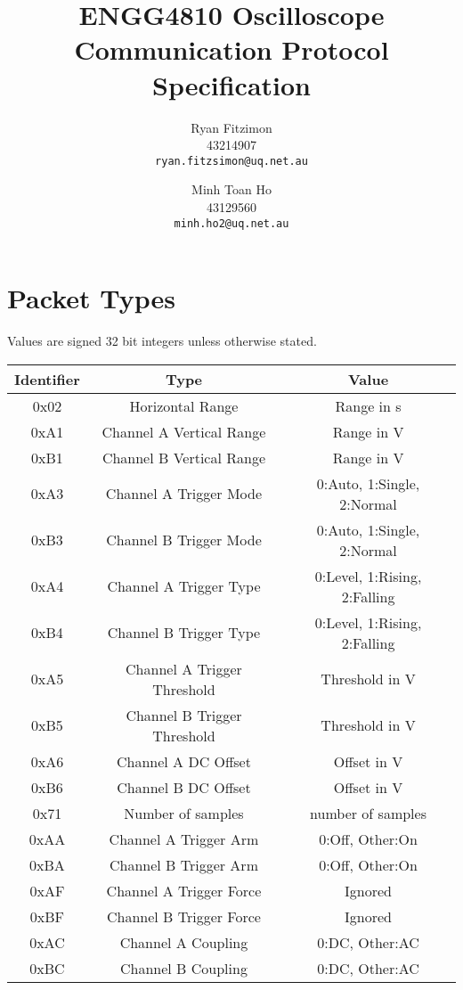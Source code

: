 \documentclass[]{article}
\title{ENGG4810 Oscilloscope Communication Protocol Specification}
\author{
	Ryan Fitzimon\\
	43214907\\
	\texttt{ryan.fitzsimon@uq.net.au}
	\and
	Minh Toan Ho\\
	43129560\\
	\texttt{minh.ho2@uq.net.au}
}
\begin{document}
\maketitle

\section{Packet Types}

Values are signed 32 bit integers unless otherwise stated.

\begin{table}[H]
	\renewcommand{\arraystretch}{1.2}
	\centering
	\begin{tabular}{|c|c|c|}
		\hline
		\textbf{Identifier} & \textbf{Type} & \textbf{Value} \\ \hline
		0x02 & Horizontal Range & Range in \textmu s \\ \hline
		0xA1 & Channel A Vertical Range & Range in \textmu V \\ \hline
		0xB1 & Channel B Vertical Range & Range in \textmu V \\ \hline
		0xA3 & Channel A Trigger Mode & 0:Auto, 1:Single, 2:Normal \\ \hline
		0xB3 & Channel B Trigger Mode & 0:Auto, 1:Single, 2:Normal \\ \hline
		0xA4 & Channel A Trigger Type & 0:Level, 1:Rising, 2:Falling \\ \hline
		0xB4 & Channel B Trigger Type & 0:Level, 1:Rising, 2:Falling \\ \hline
		0xA5 & Channel A Trigger Threshold & Threshold in \textmu V \\ \hline
		0xB5 & Channel B Trigger Threshold & Threshold in \textmu V \\ \hline
		0xA6 & Channel A DC Offset & Offset in \textmu V \\ \hline
		0xB6 & Channel B DC Offset & Offset in \textmu V \\ \hline
		0x71 & Number of samples & number of samples \\ \hline
		0xAA & Channel A Trigger Arm & 0:Off, Other:On \\ \hline 
		0xBA & Channel B Trigger Arm & 0:Off, Other:On \\ \hline 
		0xAF & Channel A Trigger Force & Ignored \\ \hline 
		0xBF & Channel B Trigger Force & Ignored \\ \hline 
		0xAC & Channel A Coupling & 0:DC, Other:AC \\ \hline
		0xBC & Channel B Coupling & 0:DC, Other:AC \\ \hline

\end{tabular}
\end{table}
\end{document}
